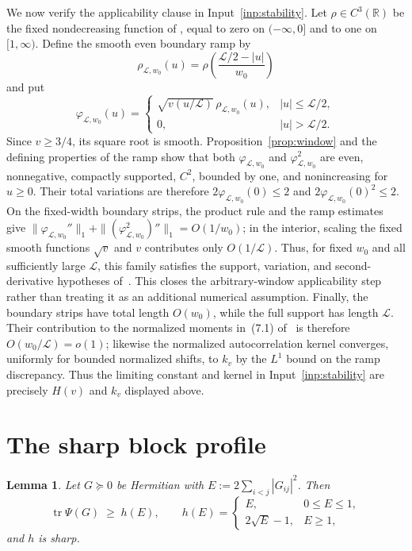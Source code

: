 \documentclass[11pt]{article}
\newtheorem{lemma}[theorem]{Lemma}
\DeclareMathOperator{\tr}{tr}
\begin{document}
We now verify the applicability clause in Input~\ref{inp:stability}.  Let
\(\rho\in C^3(\mathbb R)\) be the fixed nondecreasing function of
\cite[\S2.2]{Claude26}, equal to zero on $(-\infty,0]$ and to one on
$[1,\infty)$.  Define the smooth even boundary ramp by
\[
 \rho_{\mathcal L,w_0}(u)
 =\rho\!\left(\frac{\mathcal L/2-|u|}{w_0}\right)
\]
and put
\[
 \varphi_{\mathcal L,w_0}(u)=
 \begin{cases}
  \sqrt{v(u/\mathcal L)}\,\rho_{\mathcal L,w_0}(u),
    & |u|\le\mathcal L/2,\\
  0,&|u|>\mathcal L/2.
 \end{cases}
\]
Since $v\ge3/4$, its square root is smooth.  Proposition~\ref{prop:window}
and the defining properties of the ramp show that both
$\varphi_{\mathcal L,w_0}$ and $\varphi_{\mathcal L,w_0}^2$ are even,
nonnegative, compactly supported, $C^2$, bounded
by one, and nonincreasing for $u\ge0$.  Their total variations are therefore
$2\varphi_{\mathcal L,w_0}(0)\le2$ and
$2\varphi_{\mathcal L,w_0}(0)^2\le2$.  On the fixed-width
boundary strips, the product rule and the ramp estimates give
$\|\varphi_{\mathcal L,w_0}''\|_1+
\| (\varphi_{\mathcal L,w_0}^2)''\|_1=O(1/w_0)$; in the interior,
scaling the fixed smooth functions $\sqrt v$ and $v$ contributes only
$O(1/\mathcal L)$.  Thus, for fixed $w_0$ and all sufficiently large
$\mathcal L$, this family
satisfies the support, variation, and second-derivative hypotheses
of~\cite[\S7.1]{Claude26}.  This closes the arbitrary-window applicability
step rather than treating it as an additional numerical assumption.  Finally,
the boundary strips have total length $O(w_0)$, while the full support has
length $\mathcal L$.  Their contribution to the normalized moments in~(7.1)
of~\cite{Claude26} is therefore $O(w_0/\mathcal L)=o(1)$; likewise the
normalized autocorrelation
kernel converges, uniformly for bounded normalized shifts, to $k_v$ by the
$L^1$ bound on the ramp discrepancy.  Thus the limiting constant and kernel
in Input~\ref{inp:stability} are precisely $H(v)$ and $k_v$ displayed above.

\section{The sharp block profile}\label{sec:profile}

\begin{lemma}\label{lem:profile}
Let $G\succeq0$ be Hermitian with $E:=2\sum_{i<j}|G_{ij}|^2$.  Then
\[
 \tr\Psi(G)\;\ge\;h(E),\qquad
 h(E)=\begin{cases}E,&0\le E\le1,\\ 2\sqrt E-1,&E\ge1,\end{cases}
\]
and $h$ is sharp.
\end{lemma}
\end{document}
